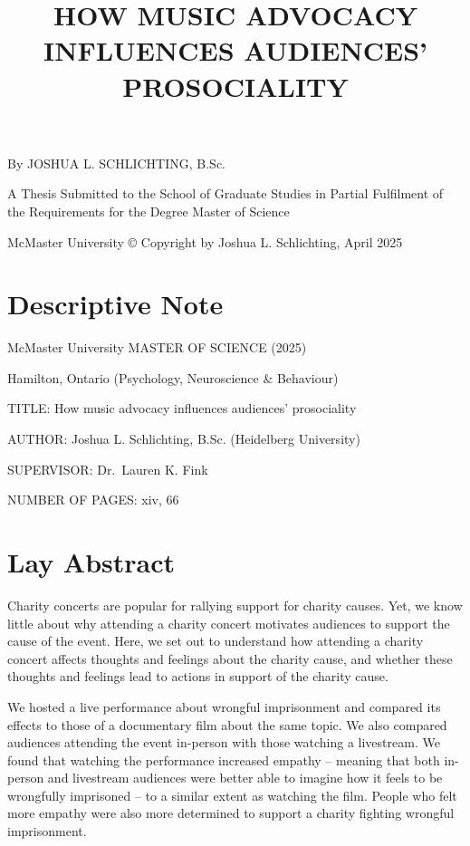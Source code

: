 \documentclass[
  man,floatsintext]{apa6}
\title{HOW MUSIC ADVOCACY INFLUENCES AUDIENCES' PROSOCIALITY}
\author{\phantom{0}}
\date{}
\affiliation{\phantom{0}}
\begin{document}
\maketitle

\thispagestyle{secondtitle} 
\begin{center}

By JOSHUA L. SCHLICHTING, B.Sc.  
\newline

A Thesis Submitted to the School of Graduate Studies in Partial Fulfilment of the Requirements for the Degree Master of Science  
\newline

McMaster University © Copyright by Joshua L. Schlichting, April 2025  
\end{center}

\newpage

\section*{Descriptive Note}\label{descriptive-note}

\setcounter{page}{2}

McMaster University MASTER OF SCIENCE (2025)

Hamilton, Ontario (Psychology, Neuroscience \& Behaviour)
\newline

TITLE: How music advocacy influences audiences' prosociality

AUTHOR: Joshua L. Schlichting, B.Sc. (Heidelberg University)

SUPERVISOR: Dr.~Lauren K. Fink

NUMBER OF PAGES: xiv, 66

\newpage

\section*{Lay Abstract}\label{lay-abstract}

Charity concerts are popular for rallying support for charity causes. Yet, we know little about why attending a charity concert motivates audiences to support the cause of the event. Here, we set out to understand how attending a charity concert affects thoughts and feelings about the charity cause, and whether these thoughts and feelings lead to actions in support of the charity cause.

We hosted a live performance about wrongful imprisonment and compared its effects to those of a documentary film about the same topic. We also compared audiences attending the event in-person with those watching a livestream. We found that watching the performance increased empathy -- meaning that both in-person and livestream audiences were better able to imagine how it feels to be wrongfully imprisoned -- to a similar extent as watching the film. People who felt more empathy were also more determined to support a charity fighting wrongful imprisonment.
\end{document}
